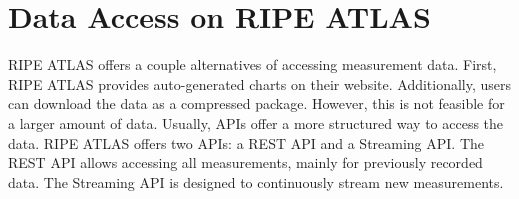 \section{Data Access on RIPE ATLAS} \label{sec:dataaccess_ripeatlas}

RIPE ATLAS offers a couple alternatives of accessing measurement data. First, RIPE ATLAS provides auto-generated charts on their website. Additionally, users can download the data as a compressed package.
However, this is not feasible for a larger amount of data. Usually, APIs offer a more structured way to access the data. RIPE ATLAS offers two APIs: a REST API and a Streaming API. The REST API allows accessing all measurements, mainly for previously recorded data. The Streaming API is designed to continuously stream new measurements.

